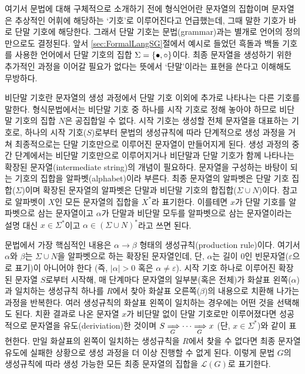 여기서 문법에 대해 구체적으로 소개하기 전에 형식언어란 문자열의 집합이며
문자열은 추상적인 어휘에 해당하는 `기호'로 이루어진다고 언급했는데,
그때 말한 기호가 바로 단말 기호에 해당한다.
그래서 단말 기호는 문법(grammar)과는 별개로 언어의 정의만으로도 결정된다.
앞서 \ref{sec:FormalLangSG}절에서 예시로 들었던 흑돌과 백돌 기호를 사용한
언어에서 단말 기호의 집합 $\Sigma = \{\bullet, \circ\}$이다.
최종 문자열을 생성하기 위한 추가적인 과정을 이어갈 필요가 없다는 뜻에서
`단말'이라는 표현을 쓴다고 이해해도 무방하다.

비단말 기호란 문자열의 생성 과정에서 단말 기호 이외에 추가로 나타나는
다른 기호를 말한다. 형식문법에서는 비단말 기호 중 하나를 시작 기호로
정해 놓아야 하므로 비단말 기호의 집합 $N$은 공집합일 수 없다. 시작 기호는
생성할 전체 문자열을 대표하는 기호로, 하나의 시작 기호($S$)로부터 문법의
생성규칙에 따라 단계적으로 생성 과정을 거쳐 최종적으로는 단말 기호만으로
이루어진 문자열이 만들어지게 된다. 생성 과정의 중간 단계에서는 비단말 기호만으로
이루어지거나 비단말과 단말 기호가 함께 나타나는
%
%
%
%
확장된 문자열(intermediate string)의 개념이 필요하다.
문자열을 구성하는 바탕이 되는 기호의 집합을
%
%
%
%
알파벳(alphabet)이라 부른다.
최종 문자열의 알파벳은 단말 기호 집합($\Sigma$)이며 확장된 문자열의 알파벳은
단말과 비단말 기호의 합집합($\Sigma\cup N$)이다. 참고로 알파벳이 $X$인
모든 문자열의 집합을 $X^{*}$라 표기한다. 이를테면
$x$가 단말 기호를 알파벳으로 삼는 문자열이고
$\alpha$가 단말과 비단말 모두를 알파벳으로 삼는 문자열이라는
설명 대신 $x\in\Sigma^{*}$이고 $\alpha\in(\Sigma\cup N)^{*}$라고 쓰면 된다.

문법에서 가장 핵심적인 내용은 $\alpha\to\beta$ 형태의
%
%
생성규칙(production rule)이다.
여기서 $\alpha$와 $\beta$는  $\Sigma\cup N$을 알파벳으로 하는 확장된 문자열인데,
단, $\alpha$는 길이 0인 빈문자열($\varepsilon$으로 표기)이 아니어야 한다
(즉, $\lvert\alpha\rvert>0$ 혹은 $\alpha\neq\varepsilon$).
시작 기호 하나로 이루어진 확장된 문자열 $S$로부터 시작해, 매 단계마다
문자열의 일부분(혹은 전체)가 화살표 왼쪽($\alpha$)과 일치하는 생성규칙
하나를 $R$에서 찾아 화살표 오른쪽($\beta$)의 내용으로 치환해 나가는 과정을
반복한다. 여러 생성규칙의 화살표 왼쪽이 일치하는 경우에는 어떤 것을 선택해도 된다.
치환 결과로 나온 문자열 $x$가 비단말 없이 단말 기호로만 이루어졌다면
성공적으로 문자열을
%
%
유도(deriviation)한 것이며
$S\xRightarrow[\,G]{} \cdots \xRightarrow[\,G]{} x$ (단, $x\in\Sigma^{*}$)와 같이 표현한다.
만일 화살표의 왼쪽이 일치하는 생성규칙을 $R$에서 찾을 수 없다면
최종 문자열 유도에 실패한 상황으로 생성 과정을 더 이상 진행할 수 없게 된다.
이렇게 문법 $G$의 생성규칙에 따라 생성 가능한 모든 최종 문자열의 집합을
$\mathcal{L}(G)$로 표기한다.

